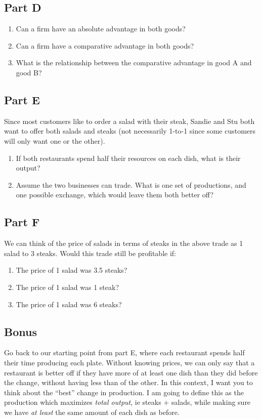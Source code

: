 \documentclass[12pt]{article}
\begin{document}
\subsection*{Part D}

\begin{enumerate}
    \item Can a firm have an absolute advantage in both goods?
    \item Can a firm have a comparative advantage in both goods?
    \item What is the relationship between the comparative advantage in good A and good B?
\end{enumerate}

\subsection*{Part E}
Since most customers like to order a salad with their steak, Sandie and Stu both want to offer both salads and steaks (not necessarily 1-to-1 since some customers will only want one or the other).

\begin{enumerate}
    \item If both restaurants spend half their resources on each dish, what is their output?
    \item Assume the two businesses can trade. What is one set of productions, and one possible exchange, which would leave them both better off?
\end{enumerate}

\subsection*{Part F}
We can think of the price of salads in terms of steaks in the above trade as 1 salad to 3 steaks. Would this trade still be profitable if:

\begin{enumerate}
    \item The price of 1 salad was 3.5 steaks?
    \item The price of 1 salad was 1 steak?
    \item The price of 1 salad was 6 steaks?
\end{enumerate}

\subsection*{Bonus}
Go back to our starting point from part E, where each restaurant spends half their time producing each plate. Without knowing prices, we can only say that a restaurant is better off if they have more of at least one dish than they did before the change, without having less than of the other. In this context, I want you to think about the ``best'' change in production. I am going to define this as the production which maximizes \textit{total output}, ie steaks + salads, while making sure we have \textit{at least} the same amount of each dish as before.
\end{document}
